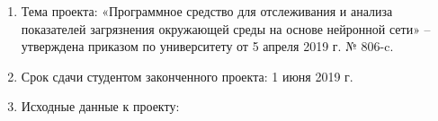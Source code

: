     \begin{enumerate}[label=\textbf{\arabic*}, itemsep=1em,
      leftmargin=*,
      itemindent=\taskLiskSectionItemLeftIndent-\taskLiskSubsectionDelta]
      \item Тема проекта: «Программное средство для отслеживания и анализа показателей загрязнения окружающей среды на основе нейронной сети» -- утверждена приказом по университету от
      {5 апреля 2019 г. № 806-c}.
      \item Срок сдачи студентом законченного проекта: 1 июня 2019 г.
      \item Исходные данные к проекту:


\end{enumerate}
